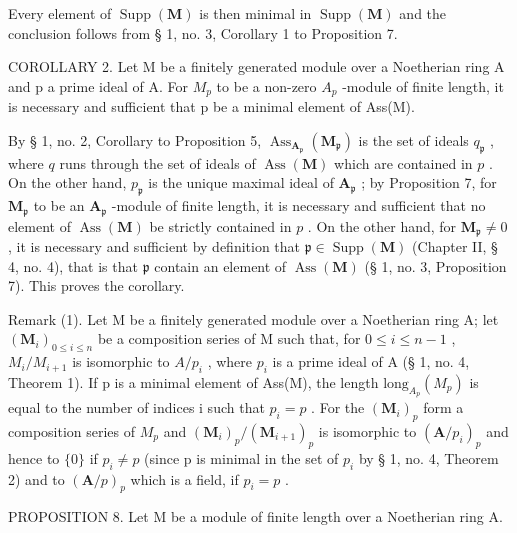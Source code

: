 Every element of \(\operatorname{Supp}(\mathbf{M})\) is then minimal in \(\operatorname{Supp}(\mathbf{M})\) and the conclusion follows from § 1, no. 3, Corollary 1 to Proposition 7.

COROLLARY 2. Let M be a finitely generated module over a Noetherian ring A and p a prime ideal of A. For \(M_{p}\) to be a non-zero \(A_{p}\) -module of finite length, it is necessary and sufficient that p be a minimal element of Ass(M).

By § 1, no. 2, Corollary to Proposition 5, \(\operatorname{Ass}_{\mathbf{A}_{\mathfrak{p}}}(\mathbf{M}_{\mathfrak{p}})\) is the set of ideals \(q_{\mathfrak{p}}\) , where \(q\) runs through the set of ideals of \(\operatorname{Ass}(\mathbf{M})\) which are contained in \(p\) . On the other hand, \(p_{\mathfrak{p}}\) is the unique maximal ideal of \(\mathbf{A}_{\mathfrak{p}}\) ; by Proposition 7, for \(\mathbf{M}_{\mathfrak{p}}\) to be an \(\mathbf{A}_{\mathfrak{p}}\) -module of finite length, it is necessary and sufficient that no element of \(\operatorname{Ass}(\mathbf{M})\) be strictly contained in \(p\) . On the other hand, for \(\mathbf{M}_{\mathfrak{p}} \neq 0\) , it is necessary and sufficient by definition that \(\mathfrak{p} \in \operatorname{Supp}(\mathbf{M})\) (Chapter II, § 4, no. 4), that is that \(\mathfrak{p}\) contain an element of \(\operatorname{Ass}(\mathbf{M})\) (§ 1, no. 3, Proposition 7). This proves the corollary.

Remark (1). Let M be a finitely generated module over a Noetherian ring A; let \((\mathbf{M}_{i})_{0\leqslant i\leqslant n}\) be a composition series of M such that, for \(0\leqslant i\leqslant n-1\) , \(M_{i}/M_{i+1}\) is isomorphic to \(A/p_{i}\) , where \(p_{i}\) is a prime ideal of A (§ 1, no. 4, Theorem 1). If p is a minimal element of Ass(M), the length \(\text{long}_{A_{p}}(M_{p})\) is equal to the number of indices i such that \(p_{i}=p\) . For the \((\mathbf{M}_{i})_{p}\) form a composition series of \(M_{p}\) and \((\mathbf{M}_{i})_{p}/(\mathbf{M}_{i+1})_{p}\) is isomorphic to \((\mathbf{A}/p_{i})_{p}\) and hence to \(\{0\}\) if \(p_{i}\neq p\) (since p is minimal in the set of \(p_{i}\) by § 1, no. 4, Theorem 2) and to \((\mathbf{A}/p)_{p}\) which is a field, if \(p_{i}=p\) .

PROPOSITION 8. Let M be a module of finite length over a Noetherian ring A.

